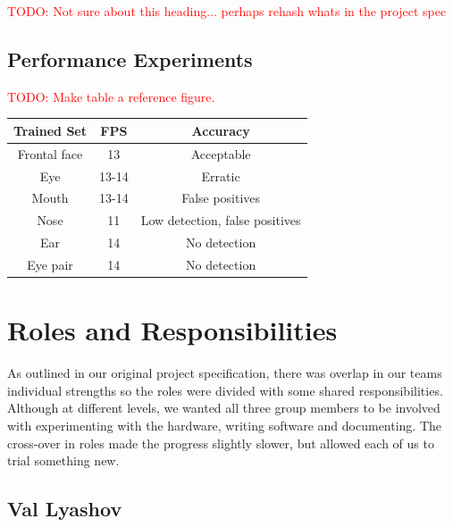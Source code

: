\documentclass[11pt,a4paper,titlepage]{report}
\begin{document}
\textcolor{red}{TODO: Not sure about this heading... perhaps rehash whats in the project spec}

\subsection{Performance Experiments}



\textcolor{red}{TODO: Make table a reference figure.}


\begin{center}
\begin{table}
\begin{tabular}{|c|c|c|}
    \hline
    \textbf{Trained Set} & \textbf{FPS} & \textbf{Accuracy} \\ \hline
    
    Frontal face & 13 & Acceptable \\ \hline
    
    Eye & 13-14 & Erratic \\ \hline
    
    Mouth & 13-14 & False positives \\ \hline
    
    Nose & 11 & Low detection, false positives \\ \hline
    
    Ear & 14 & No detection \\ \hline
    
    Eye pair & 14 & No detection \\ \hline

\end{tabular}
\end{table}
\end{center}




\section{Roles and Responsibilities}

As outlined in our original project specification, there was overlap in our teams individual strengths so the roles were divided with some shared responsibilities. Although at different levels, we wanted all three group members to be involved with experimenting with the hardware, writing software and documenting. The cross-over in roles made the progress slightly slower, but allowed each of us to trial something new.

\subsection{Val Lyashov}
\end{document}

